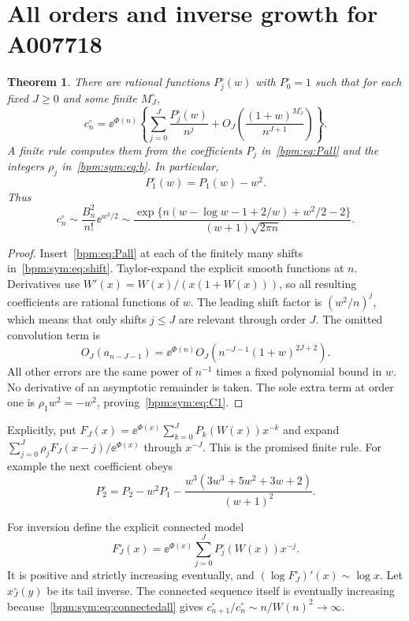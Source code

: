\documentclass[11pt,a4paper]{article}
\newtheorem{theorem}{Theorem}[section]\newtheorem{lemma}[theorem]{Lemma}\newtheorem{proposition}[theorem]{Proposition}
\theoremstyle{remark}\newtheorem{remark}[theorem]{Remark}%
\begin{document}
\section{All orders and inverse growth for A007718}
\begin{theorem}\label{bpm:sym:thm:connectedall}
There are rational functions $P^\circ_j(w)$ with $P^\circ_0=1$ such that for each fixed $J\ge0$ and some finite $M^\circ_J$,
\begin{equation}\label{bpm:sym:eq:connectedall}
 c^\circ_n=\ee^{\Phi(n)}\left\{\sum_{j=0}^J\frac{P^\circ_j(w)}{n^j}
 +O_J\!\left(\frac{(1+w)^{M^\circ_J}}{n^{J+1}}\right)\right\}.
\end{equation}
A finite rule computes them from the coefficients $P_j$ in~\eqref{bpm:eq:Pall} and the integers $\rho_j$ in~\eqref{bpm:sym:eq:b}. In particular,
\begin{equation}\label{bpm:sym:eq:C1}
 P^\circ_1(w)=P_1(w)-w^2.
\end{equation}
Thus
\[
 c^\circ_n\sim\frac{B_n^2}{n!}\ee^{w^2/2}
 \sim\frac{\exp\{n(w-\log w-1+2/w)+w^2/2-2\}}
 {(w+1)\sqrt{2\pi n}}.
\]
\end{theorem}
\begin{proof}
Insert~\eqref{bpm:eq:Pall} at each of the finitely many shifts in~\eqref{bpm:sym:eq:shift}. Taylor-expand the explicit smooth functions at $n$. Derivatives use $W'(x)=W(x)/(x(1+W(x)))$, so all resulting coefficients are rational functions of $w$. The leading shift factor is $(w^2/n)^j$, which means that only shifts $j\le J$ are relevant through order $J$. The omitted convolution term is
\[
 O_J(a_{n-J-1})=\ee^{\Phi(n)}O_J(n^{-J-1}(1+w)^{2J+2}).
\]
All other errors are the same power of $n^{-1}$ times a fixed polynomial bound in $w$. No derivative of an asymptotic remainder is taken. The sole extra term at order one is $\rho_1w^2=-w^2$, proving~\eqref{bpm:sym:eq:C1}.
\end{proof}
Explicitly, put $F_J(x)=\ee^{\Phi(x)}\sum_{k=0}^J P_k(W(x))x^{-k}$ and expand
$\sum_{j=0}^J \rho_jF_J(x-j)/\ee^{\Phi(x)}$ through $x^{-J}$. This is the promised finite rule. For example the next coefficient obeys
\[
 P^\circ_2=P_2-w^2P_1-\frac{w^3(3w^3+5w^2+3w+2)}{(w+1)^2}.
\]

For inversion define the explicit connected model
\begin{equation}\label{bpm:sym:eq:model}
 F^\circ_J(x)=\ee^{\Phi(x)}\sum_{j=0}^J P^\circ_j(W(x))x^{-j}.
\end{equation}
It is positive and strictly increasing eventually, and
$(\log F^\circ_J)'(x)\sim\log x$. Let $x^\circ_J(y)$ be its tail inverse. The connected sequence itself is eventually increasing because~\eqref{bpm:sym:eq:connectedall} gives $c^\circ_{n+1}/c^\circ_n\sim n/W(n)^2\to\infty$.
\end{document}
